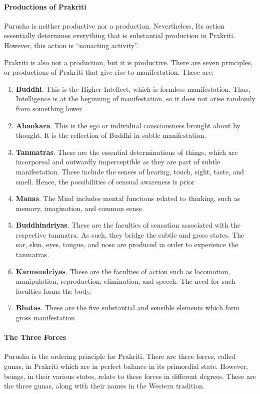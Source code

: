 \paragraph{Productions of Prakriti}
Purusha is neither productive nor a production. Nevertheless, Its action essentially determines everything that is substantial production in Prakriti. However, this action is “nonacting activity”.

Prakriti is also not a production, but it is productive. There are seven principles, or productions of Prakriti that give rise to manifestation. These are:

\begin{enumerate}
\item \textbf{Buddhi}. This is the Higher Intellect, which is formless manifestation. Thus, Intelligence is at the beginning of manifestation, so it does not arise randomly from something lower. 
\item \textbf{Ahankara}. This is the ego or individual consciousness brought about by thought. It is the reflection of Buddhi in subtle manifestation. 
\item \textbf{Tanmatras}. These are the essential determinations of things, which are incorporeal and outwardly imperceptible as they are part of subtle manifestation. These include the senses of hearing, touch, sight, taste, and smell. Hence, the possibilities of sensual awareness is prior 
\item \textbf{Manas}. The Mind includes mental functions related to thinking, such as memory, imagination, and common sense. 
\item \textbf{Buddhindriyas}. These are the faculties of sensation associated with the respective tanmatra. As such, they bridge the subtle and gross states. The ear, skin, eyes, tongue, and nose are produced in order to experience the tanmatras. 
\item \textbf{Karmendriyas}. These are the faculties of action such as locomotion, manipulation, reproduction, elimination, and speech. The need for such faculties forms the body. 
\item \textbf{Bhutas}. These are the five substantial and sensible elements which form gross manifestation 
\end{enumerate}
\paragraph{The Three Forces}
Purusha is the ordering principle for Prakriti. There are three forces, called gunas, in Prakriti which are in perfect balance in its primordial state. However, beings, in their various states, relate to these forces in different degrees. These are the three gunas, along with their names in the Western tradition.

